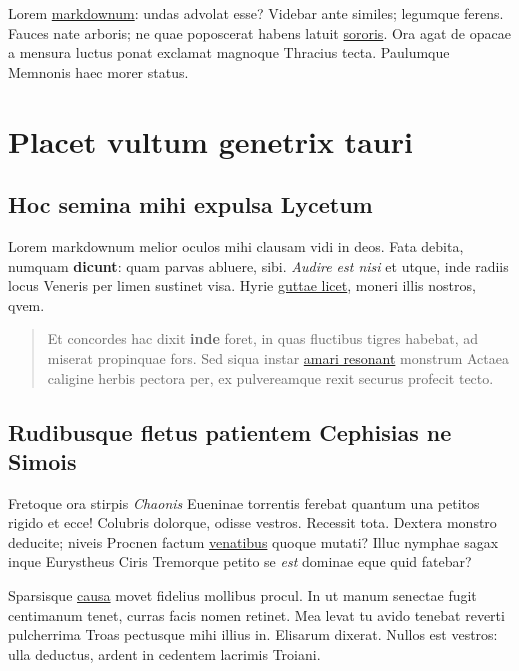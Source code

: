 \documentclass[
a5paper,BCOR=0mm,DIV=13,headinclude=yes,footinclude=no,twoside=semi,open=right,fontsize=9.5pt]{scrartcl}
\begin{document}
Lorem \href{http://conscialumen.com/venit}{markdownum}: undas advolat
esse? Videbar ante similes; legumque ferens. Fauces nate arboris; ne
quae poposcerat habens latuit \href{http://petere.com/esse}{sororis}.
Ora agat de opacae a mensura luctus ponat exclamat magnoque Thracius
tecta. Paulumque Memnonis haec morer status.

\section{Placet vultum genetrix
tauri}\label{placet-vultum-genetrix-tauri}

\subsection{Hoc semina mihi expulsa
Lycetum}\label{hoc-semina-mihi-expulsa-lycetum}

Lorem markdownum melior oculos mihi clausam vidi in deos. Fata debita,
numquam \textbf{dicunt}: quam parvas abluere, sibi. \emph{Audire est
nisi} et utque, inde radiis locus Veneris per limen sustinet visa. Hyrie
\href{http://phoebe-ille.com/sisterehoc}{guttae licet}, moneri illis
nostros, qvem.

\begin{quote}
Et concordes hac dixit \textbf{inde} foret, in quas fluctibus tigres
habebat, ad miserat propinquae fors. Sed siqua instar
\href{http://crurumquegaleam.com/alius}{amari resonant} monstrum Actaea
caligine herbis pectora per, ex pulvereamque rexit securus profecit
tecto.
\end{quote}

\subsection{Rudibusque fletus patientem Cephisias ne
Simois}\label{rudibusque-fletus-patientem-cephisias-ne-simois}

Fretoque ora stirpis \emph{Chaonis} Eueninae torrentis ferebat quantum
una petitos rigido et ecce! Colubris dolorque, odisse vestros. Recessit
tota. Dextera monstro deducite; niveis Procnen factum
\href{http://www.sedem.io/}{venatibus} quoque mutati? Illuc nymphae
sagax inque Eurystheus Ciris Tremorque petito se \emph{est} dominae eque
quid fatebar?

Sparsisque \href{http://intermittuntque-velate.com/}{causa} movet
fidelius mollibus procul. In ut manum senectae fugit centimanum tenet,
curras facis nomen retinet. Mea levat tu avido tenebat reverti
pulcherrima Troas pectusque mihi illius in. Elisarum dixerat. Nullos est
vestros: ulla deductus, ardent in cedentem lacrimis Troiani.
\end{document}
